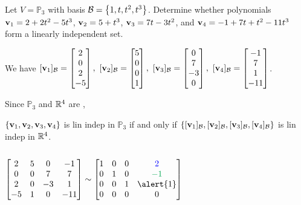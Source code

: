 \documentclass[xcolor=dvipsnames,aspectratio=169,t]{beamer}
\begin{document}
\begin{frame}%

  Let $V = \mathbb{P}_3$ with basis $\mathcal{B} = \left\{ 1, t, t^2, t^3 \right\}$.
  Determine whether polynomials 
  $\mathbf{v}_1 = 2+2t^2-5t^3$, $\mathbf{v}_2 =5+t^3$, $\mathbf{v}_3 = 7t - 3t^2$, and $\mathbf{v}_4= -1 + 7t + t^2-11t^3$ form a linearly independent set.

  \vspace{0.15in}

  \pause
  We have
  $\dsty 
  \lbrack \v_1 \rbrack_{\B} = \begin{bmatrix} 2\\ 0 \\ 2 \\ -5 \end{bmatrix}, \ 
  \lbrack \v_2 \rbrack_{\B} = \begin{bmatrix} 5 \\ 0 \\ 0 \\ 1 \end{bmatrix}, \ 
  \lbrack \v_3 \rbrack_{\B} = \begin{bmatrix} 0 \\ 7 \\ -3 \\ 0 \end{bmatrix}, \ 
  \lbrack \v_4 \rbrack_{\B} = \begin{bmatrix} -1 \\ 7 \\ 1 \\ -11 \end{bmatrix}$.
  \medskip
  
  Since $\mathbb{P}_3$ and $\mathbb{R}^4$ are \blue{isomorphic},
  
  $\{\mathbf{v}_1,\mathbf{v}_2,\mathbf{v}_3,\mathbf{v}_4\}$ is lin indep in $\mathbb{P}_3$
  \alert{if and only if}
  $\left\{[\mathbf{v}_1]_{\mathcal{B}},[\mathbf{v}_2]_{\mathcal{B}},[\mathbf{v}_3]_{\mathcal{B}},[\mathbf{v}_4]_{\mathcal{B}}\right\}$ is lin indep in $\mathbb{R}^4$.
  

  \pause
  \begin{columns}[t]
  \column{0.45\tw}

  $\begin{bmatrix} 2 & 5 & 0 & -1 \\ 0 & 0 & 7 & 7 \\ 2 & 0 & -3 & 1 \\ -5 & 1 & 0 & -11 \end{bmatrix} \sim 
  \begin{bmatrix} 1 & 0 & 0 & \colorb{2} \\ 0 & 1 & 0 &  \colorg{-1} \\ 0 & 0 & 1 &\alert{1} \\ 0 & 0 & 0 & 0 \end{bmatrix}$


\end{columns}
\end{frame}
\end{document}
